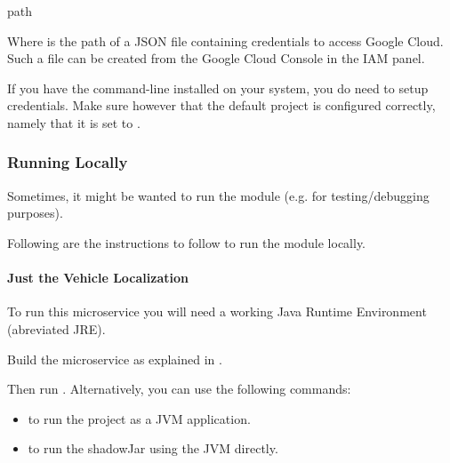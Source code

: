 \documentclass[letterpaper,10pt,english]{sphinxmanual}
\begin{document}
\begin{sphinxVerbatim}[commandchars=\\\{\}]
 \PYGZlt{}path\PYGZgt{}
\end{sphinxVerbatim}

Where  is the path of a JSON file containing credentials to access Google Cloud.
Such a file can be created from the Google Cloud Console in the IAM panel.

If you have the  command-line installed on your system, you do need to setup credentials.
Make sure however that the default project is configured correctly, namely that it is set to .


\subsubsection{Running Locally}
\label{\detokenize{microservices/vehicle_localization/running:running-locally}}
Sometimes, it might be wanted to run the  module (e.g. for testing/debugging purposes).

Following are the instructions to follow to run the module locally.


\paragraph{Just the Vehicle Localization}
\label{\detokenize{microservices/vehicle_localization/running:just-the-vehicle-localization}}
To run this microservice you will need a working Java Runtime Environment (abreviated JRE).

Build the microservice as explained in {\hyperref[\detokenize{microservices/vehicle_localization/building:building-vehicle-localization}]{}}.

Then run .
Alternatively, you can use the following commands:
\begin{itemize}
\item {} 
 to run the project as a JVM application.

\item {} 
 to run the shadowJar using the JVM directly.

\end{itemize}
\end{document}
